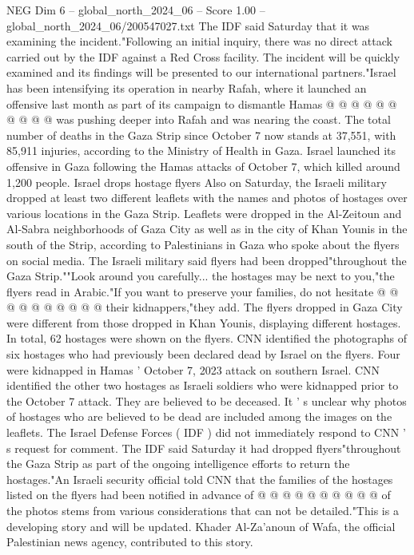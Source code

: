 \begin{textsample}{NEG Dim 6 – global\_north\_2024\_06 – Score 1.00 – global\_north\_2024\_06/200547027.txt}
The IDF said Saturday that it was examining the incident."Following an initial inquiry, there was no direct attack carried out by the IDF against a Red Cross facility.
The incident will be quickly examined and its findings will be presented to our international partners."Israel has been intensifying its operation in nearby Rafah, where it launched an offensive last month as part of its campaign to dismantle Hamas @ @ @ @ @ @ @ @ @ @ was pushing deeper into Rafah and was nearing the coast.
The total number of deaths in the Gaza Strip since October 7 now stands at 37,551, with 85,911 injuries, according to the Ministry of Health in Gaza.
Israel launched its offensive in Gaza following the Hamas attacks of October 7, which killed around 1,200 people.
Israel drops hostage flyers Also on Saturday, the Israeli military dropped at least two different leaflets with the names and photos of hostages over various locations in the Gaza Strip.
Leaflets were dropped in the Al-Zeitoun and Al-Sabra neighborhoods of Gaza City as well as in the city of Khan Younis in the south of the Strip, according to Palestinians in Gaza who spoke about the flyers on social media.
The Israeli military said flyers had been dropped"throughout the Gaza Strip.""Look around you carefully... the hostages may be next to you,"the flyers read in Arabic."If you want to preserve your families, do not hesitate @ @ @ @ @ @ @ @ @ @ their kidnappers,"they add.
The flyers dropped in Gaza City were different from those dropped in Khan Younis, displaying different hostages.
In total, 62 hostages were shown on the flyers.
CNN identified the photographs of six hostages who had previously been declared dead by Israel on the flyers.
Four were kidnapped in Hamas ' October 7, 2023 attack on southern Israel.
CNN identified the other two hostages as Israeli soldiers who were kidnapped prior to the October 7 attack.
They are believed to be deceased.
It ' s unclear why photos of hostages who are believed to be dead are included among the images on the leaflets.
The Israel Defense Forces ( IDF ) did not immediately respond to CNN ' s request for comment.
The IDF said Saturday it had dropped flyers"throughout the Gaza Strip as part of the ongoing intelligence efforts to return the hostages."An Israeli security official told CNN that the families of the hostages listed on the flyers had been notified in advance of @ @ @ @ @ @ @ @ @ @ of the photos stems from various considerations that can not be detailed."This is a developing story and will be updated.
Khader Al-Za'anoun of Wafa, the official Palestinian news agency, contributed to this story.

\end{textsample}
